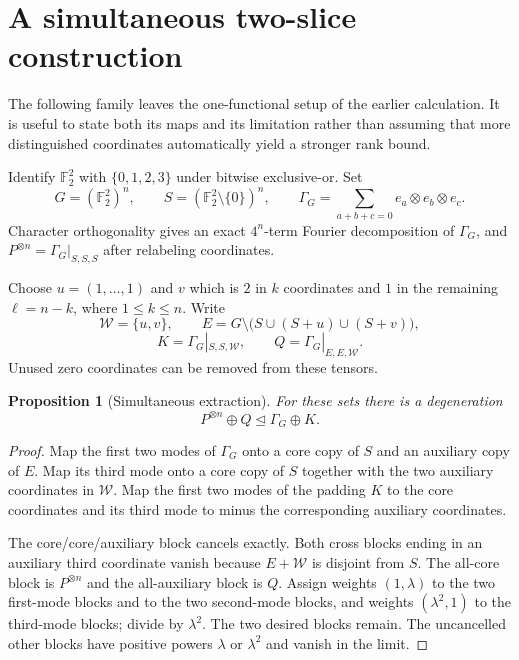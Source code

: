 \documentclass[11pt,letterpaper]{article}
\newtheorem{proposition}[theorem]{Proposition}
\theoremstyle{definition}\newtheorem{definition}[theorem]{Definition}
\theoremstyle{remark}\newtheorem{remark}[theorem]{Remark}
\newcommand{\F}{\mathbb F}
\newcommand{\degto}{\trianglelefteq}
\begin{document}
\section{A simultaneous two-slice construction}
The following family leaves the one-functional setup of the earlier calculation. It is useful to state both its maps and its limitation rather than assuming that more distinguished coordinates automatically yield a stronger rank bound.

Identify $\F_2^2$ with $\{0,1,2,3\}$ under bitwise exclusive-or. Set
\[
G=(\F_2^2)^n,\qquad S=(\F_2^2\setminus\{0\})^n,
\qquad \Gamma_G=\sum_{a+b+c=0}e_a\otimes e_b\otimes e_c.
\]
Character orthogonality gives an exact $4^n$-term Fourier decomposition of $\Gamma_G$, and $P^{\otimes n}=\Gamma_G|_{S,S,S}$ after relabeling coordinates.

Choose $u=(1,\ldots,1)$ and $v$ which is $2$ in $k$ coordinates and $1$ in the remaining $\ell=n-k$, where $1\leq k\leq n$. Write
\[
\mathcal W=\{u,v\},\qquad E=G\setminus\bigl(S\cup(S+u)\cup(S+v)\bigr),
\]
\[
K=\Gamma_G|_{S,S,\mathcal W},\qquad Q=\Gamma_G|_{E,E,\mathcal W}.
\]
Unused zero coordinates can be removed from these tensors.

\begin{proposition}[Simultaneous extraction]\label{prop:two}
For these sets there is a degeneration
\begin{equation}\label{eq:twomap}
P^{\otimes n}\oplus Q\degto\Gamma_G\oplus K.
\end{equation}
\end{proposition}
\begin{proof}
Map the first two modes of $\Gamma_G$ onto a core copy of $S$ and an auxiliary copy of $E$. Map its third mode onto a core copy of $S$ together with the two auxiliary coordinates in $\mathcal W$. Map the first two modes of the padding $K$ to the core coordinates and its third mode to minus the corresponding auxiliary coordinates.

The core/core/auxiliary block cancels exactly. Both cross blocks ending in an auxiliary third coordinate vanish because $E+\mathcal W$ is disjoint from $S$. The all-core block is $P^{\otimes n}$ and the all-auxiliary block is $Q$. Assign weights $(1,\lambda)$ to the two first-mode blocks and to the two second-mode blocks, and weights $(\lambda^2,1)$ to the third-mode blocks; divide by $\lambda^2$. The two desired blocks remain. The uncancelled other blocks have positive powers $\lambda$ or $\lambda^2$ and vanish in the limit.
\end{proof}
\end{document}
